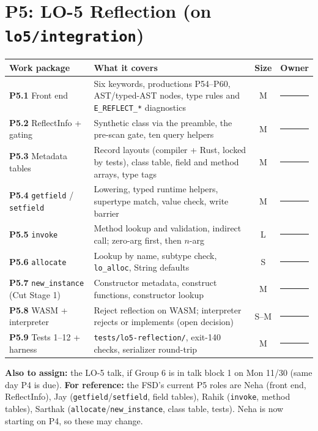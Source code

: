 \documentclass[10pt]{article}
\newcommand{\code}[1]{\texttt{\small #1}}
\newcommand{\own}{\rule{2.2cm}{0.4pt}}
\begin{document}
\section*{P5: LO-5 Reflection (on \code{lo5/integration})}
\begin{tabularx}{\linewidth}{@{}L{4.6cm} X c c@{}}
\toprule
\textbf{Work package} & \textbf{What it covers} & \textbf{Size} & \textbf{Owner} \\
\midrule
\textbf{P5.1} Front end & Six keywords, productions P54--P60, AST/typed-AST nodes, type rules and \code{E\_REFLECT\_*} diagnostics & M & \own \\
\textbf{P5.2} ReflectInfo + gating & Synthetic class via the preamble, the pre-scan gate, ten query helpers & M & \own \\
\textbf{P5.3} Metadata tables & Record layouts (compiler + Rust, locked by tests), class table, field and method arrays, type tags & M & \own \\
\textbf{P5.4} \code{getfield} / \code{setfield} & Lowering, typed runtime helpers, supertype match, value check, write barrier & M & \own \\
\textbf{P5.5} \code{invoke} & Method lookup and validation, indirect call; zero-arg first, then $n$-arg & L & \own \\
\textbf{P5.6} \code{allocate} & Lookup by name, subtype check, \code{lo\_alloc}, String defaults & S & \own \\
\textbf{P5.7} \code{new\_instance} (Cut Stage 1) & Constructor metadata, construct functions, constructor lookup & M & \own \\
\textbf{P5.8} WASM + interpreter & Reject reflection on WASM; interpreter rejects or implements (open decision) & S--M & \own \\
\textbf{P5.9} Tests 1--12 + harness & \code{tests/lo5-reflection/}, exit-140 checks, serializer round-trip & M & \own \\
\bottomrule
\end{tabularx}

\vspace{0.4em}
\textbf{Also to assign:} the LO-5 talk, if Group 6 is in talk block 1 on Mon 11/30 (same day P4 is due).
\textbf{For reference:} the FSD's current P5 roles are Neha (front end, ReflectInfo), Jay
(\code{getfield}/\code{setfield}, field tables), Rahik (\code{invoke}, method tables), Sarthak
(\code{allocate}/\code{new\_instance}, class table, tests). Neha is now starting on P4, so these may change.
\end{document}
